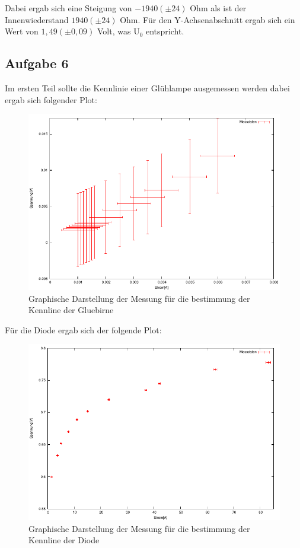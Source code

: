 \documentclass[12pt]{scrartcl}
\begin{document}
Dabei ergab sich eine Steigung von $-1940 (\pm 24)$ Ohm als ist der Innenwiederstand $1940 (\pm 24)$ Ohm.
Für den Y-Achsenabschnitt ergab sich ein Wert von $1,49	(\pm 0,09)$ Volt, was U$_0$ entspricht.

\newpage

\subsection{Aufgabe 6}
Im ersten Teil sollte die Kennlinie einer Glühlampe ausgemessen werden dabei ergab sich folgender Plot:

\begin{figure}[htbp] 
	 \centering
	   \includegraphics[scale = 1]{Gluebirne.pdf}
	 	\caption[Graphische Darstellung der Messung für die bestimmung der Kennline der Gluebirne]{Graphische Darstellung der Messung für die bestimmung der Kennline der Gluebirne}
	 \label{fig:aufgabe_6_a_plot}
\end{figure}

Für die Diode ergab sich der folgende Plot:

\begin{figure}[htbp] 
	 \centering
	   \includegraphics[scale = 1]{Diode.pdf}
	 	\caption[Graphische Darstellung der Messung für die bestimmung der Kennline der Diode]{Graphische Darstellung der Messung für die bestimmung der Kennline der Diode}
	 \label{fig:aufgabe_6_a_plot}
\end{figure}
\end{document}
